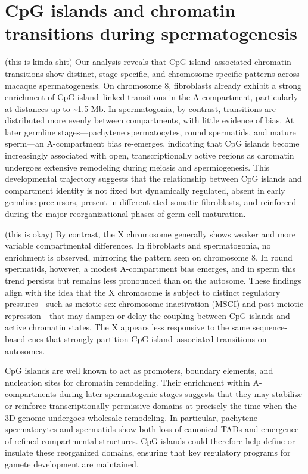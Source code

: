 \documentclass[
  a4paper,
  openany]{scrbook}
\begin{document}
\section{CpG islands and chromatin transitions during
spermatogenesis}\label{cpg-islands-and-chromatin-transitions-during-spermatogenesis}

(this is kinda shit) Our analysis reveals that CpG island--associated
chromatin transitions show distinct, stage-specific, and
chromosome-specific patterns across macaque spermatogenesis. On
chromosome 8, fibroblasts already exhibit a strong enrichment of CpG
island--linked transitions in the A-compartment, particularly at
distances up to \textasciitilde1.5 Mb. In spermatogonia, by contrast,
transitions are distributed more evenly between compartments, with
little evidence of bias. At later germline stages---pachytene
spermatocytes, round spermatids, and mature sperm---an A-compartment
bias re-emerges, indicating that CpG islands become increasingly
associated with open, transcriptionally active regions as chromatin
undergoes extensive remodeling during meiosis and spermiogenesis. This
developmental trajectory suggests that the relationship between CpG
islands and compartment identity is not fixed but dynamically regulated,
absent in early germline precursors, present in differentiated somatic
fibroblasts, and reinforced during the major reorganizational phases of
germ cell maturation.

(this is okay) By contrast, the X chromosome generally shows weaker and
more variable compartmental differences. In fibroblasts and
spermatogonia, no enrichment is observed, mirroring the pattern seen on
chromosome 8. In round spermatids, however, a modest A-compartment bias
emerges, and in sperm this trend persists but remains less pronounced
than on the autosome. These findings align with the idea that the X
chromosome is subject to distinct regulatory pressures---such as meiotic
sex chromosome inactivation (MSCI) and post-meiotic repression---that
may dampen or delay the coupling between CpG islands and active
chromatin states. The X appears less responsive to the same
sequence-based cues that strongly partition CpG island--associated
transitions on autosomes.

CpG islands are well known to act as promoters, boundary elements, and
nucleation sites for chromatin remodeling. Their enrichment within
A-compartments during later spermatogenic stages suggests that they may
stabilize or reinforce transcriptionally permissive domains at precisely
the time when the 3D genome undergoes wholesale remodeling. In
particular, pachytene spermatocytes and spermatids show both loss of
canonical TADs and emergence of refined compartmental structures. CpG
islands could therefore help define or insulate these reorganized
domains, ensuring that key regulatory programs for gamete development
are maintained.
\end{document}
